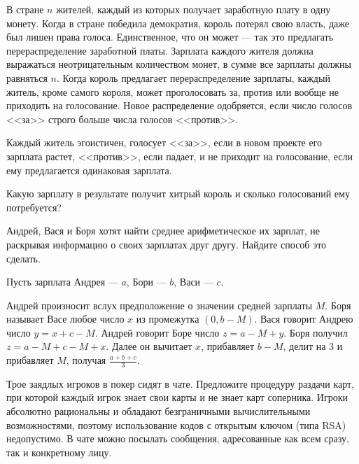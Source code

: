 \begin{problem}
В стране  $n$  жителей, каждый из которых получает заработную плату в одну монету. Когда в стране победила демократия, король потерял свою власть, даже был лишен права голоса. Единственное, что он может --- так это предлагать перераспределение заработной платы. Зарплата каждого жителя должна выражаться неотрицательным количеством монет, в сумме все зарплаты должны равняться  $n$. Когда король предлагает перераспределение зарплаты, каждый житель, кроме самого короля, может проголосовать за, против или вообще не приходить на голосование. Новое распределение одобряется, если число голосов <<за>> строго больше числа голосов <<против>>.\par
Каждый житель эгоистичен, голосует <<за>>, если в новом проекте его зарплата растет, <<против>>, если падает, и не приходит на голосование, если ему предлагается одинаковая зарплата.\par
Какую зарплату в результате получит хитрый король и сколько голосований ему потребуется?



\begin{sol}

\end{sol}
\end{problem}



\begin{problem}
 Андрей, Вася и Боря хотят найти среднее арифметическое их зарплат, не раскрывая информацию о своих зарплатах друг другу. Найдите способ это сделать.



\begin{sol}

Пусть зарплата Андрея --- $a$, Бори --- $b$, Васи --- $c$.

Андрей произносит вслух предположение о значении средней зарплаты $M$.
Боря называет Васе любое число $x$ из промежутка $(0, b-M)$. Вася говорит Андрею число $y=x+c-M$. Андрей говорит Боре число $z= a-M+y$. Боря получил $z = a-M+c-M+x$. Далее он вычитает $x$, прибавляет $b-M$, делит на 3 и прибавляет $M$, получая $\frac{a+b+c}{3}$.
\end{sol}
\end{problem}



\begin{problem}
Трое заядлых игроков в покер сидят в чате. Предложите процедуру раздачи карт, при которой каждый игрок знает свои карты и не знает карт соперника. Игроки абсолютно рациональны и обладают безграничными вычислительными возможностями, поэтому использование кодов с открытым ключом (типа RSA) недопустимо. В чате можно посылать сообщения, адресованные как всем сразу, так и конкретному лицу.\par



\begin{sol}

\end{sol}
\end{problem}




